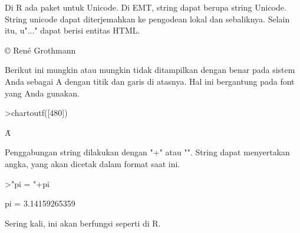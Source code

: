 \documentclass[a4paper,10pt]{article}
\begin{document}
\begin{eulernotebook}
\begin{eulercomment}
\begin{eulercomment}
\begin{eulercomment}
\begin{eulercomment}
\begin{eulercomment}
\begin{eulercomment}
\begin{eulercomment}
\begin{eulercomment}
\begin{eulercomment}
\begin{eulercomment}
\begin{eulercomment}
\begin{eulercomment}
\begin{eulercomment}
\begin{eulercomment}
\begin{eulercomment}
\begin{eulercomment}
\begin{eulercomment}
\begin{eulercomment}
\begin{eulercomment}
\begin{eulercomment}
\begin{eulercomment}
\begin{eulercomment}
\begin{eulercomment}
\begin{eulercomment}
\begin{eulercomment}
\begin{eulercomment}
\begin{eulercomment}
\begin{eulercomment}
\begin{eulercomment}
\begin{eulercomment}
\begin{eulercomment}
\begin{eulercomment}
\begin{eulercomment}
\begin{eulercomment}
\begin{eulercomment}
Di R ada paket untuk Unicode. Di EMT, string dapat berupa string
Unicode. String unicode dapat diterjemahkan ke pengodean lokal dan
sebaliknya. Selain itu, u"..." dapat berisi entitas HTML.
\end{eulercomment}
\begin{euleroutput}
  © René Grothmann
\end{euleroutput}
\begin{eulercomment}
Berikut ini mungkin atau mungkin tidak ditampilkan dengan benar pada
sistem Anda sebagai A dengan titik dan garis di atasnya. Hal ini
bergantung pada font yang Anda gunakan.
\end{eulercomment}
\begin{eulerprompt}
>chartoutf([480])
\end{eulerprompt}
\begin{euleroutput}
  Ǡ
\end{euleroutput}
\begin{eulercomment}
Penggabungan string dilakukan dengan "+" atau "\textbar{}". String dapat
menyertakan angka, yang akan dicetak dalam format saat ini.
\end{eulercomment}
\begin{eulerprompt}
>"pi = "+pi
\end{eulerprompt}
\begin{euleroutput}
  pi = 3.14159265359
\end{euleroutput}
\begin{eulercomment}
Sering kali, ini akan berfungsi seperti di R.


\end{eulercomment}
\end{eulercomment}
\end{eulercomment}
\end{eulercomment}
\end{eulercomment}
\end{eulercomment}
\end{eulercomment}
\end{eulercomment}
\end{eulercomment}
\end{eulercomment}
\end{eulercomment}
\end{eulercomment}
\end{eulercomment}
\end{eulercomment}
\end{eulercomment}
\end{eulercomment}
\end{eulercomment}
\end{eulercomment}
\end{eulercomment}
\end{eulercomment}
\end{eulercomment}
\end{eulercomment}
\end{eulercomment}
\end{eulercomment}
\end{eulercomment}
\end{eulercomment}
\end{eulercomment}
\end{eulercomment}
\end{eulercomment}
\end{eulercomment}
\end{eulercomment}
\end{eulercomment}
\end{eulercomment}
\end{eulercomment}
\end{eulercomment}
\end{eulernotebook}
\end{document}
